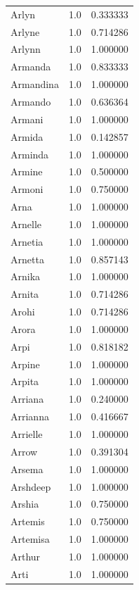 \documentclass[
  letterpaper,
  DIV=11,
  numbers=noendperiod]{scrreprt}
\begin{document}
\begin{tabular}{lrr}
Arlyn           &   1.0 &   0.333333 \\
Arlyne          &   1.0 &   0.714286 \\
Arlynn          &   1.0 &   1.000000 \\
Armanda         &   1.0 &   0.833333 \\
Armandina       &   1.0 &   1.000000 \\
Armando         &   1.0 &   0.636364 \\
Armani          &   1.0 &   1.000000 \\
Armida          &   1.0 &   0.142857 \\
Arminda         &   1.0 &   1.000000 \\
Armine          &   1.0 &   0.500000 \\
Armoni          &   1.0 &   0.750000 \\
Arna            &   1.0 &   1.000000 \\
Arnelle         &   1.0 &   1.000000 \\
Arnetia         &   1.0 &   1.000000 \\
Arnetta         &   1.0 &   0.857143 \\
Arnika          &   1.0 &   1.000000 \\
Arnita          &   1.0 &   0.714286 \\
Arohi           &   1.0 &   0.714286 \\
Arora           &   1.0 &   1.000000 \\
Arpi            &   1.0 &   0.818182 \\
Arpine          &   1.0 &   1.000000 \\
Arpita          &   1.0 &   1.000000 \\
Arriana         &   1.0 &   0.240000 \\
Arrianna        &   1.0 &   0.416667 \\
Arrielle        &   1.0 &   1.000000 \\
Arrow           &   1.0 &   0.391304 \\
Arsema          &   1.0 &   1.000000 \\
Arshdeep        &   1.0 &   1.000000 \\
Arshia          &   1.0 &   0.750000 \\
Artemis         &   1.0 &   0.750000 \\
Artemisa        &   1.0 &   1.000000 \\
Arthur          &   1.0 &   1.000000 \\
Arti            &   1.0 &   1.000000 \\

\end{tabular}
\end{document}
